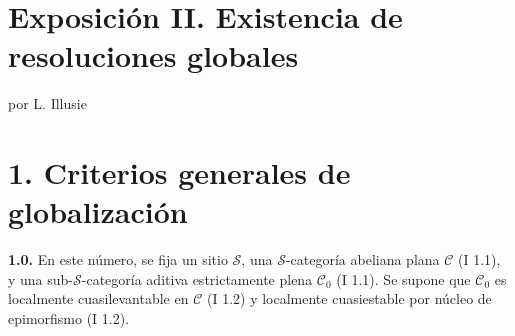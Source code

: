\providecommand{\sisi}[2]{#2}

\section*{Exposición II. Existencia de resoluciones globales}
\begin{center}
por L. Illusie
\end{center}

\section*{1. Criterios generales de globalización}

\textbf{1.0.} En este número, se fija un sitio $\sisi{S}{\mathcal S}$, una $\sisi{S}{\mathcal S}$-categoría abeliana plana \(\mathcal C\) (I 1.1), y una sub-$\sisi{S}{\mathcal S}$-categoría aditiva estrictamente plena \(\mathcal C_0\) (I 1.1). Se supone que \(\mathcal C_0\) es localmente cuasilevantable en \(\mathcal C\) (I 1.2) y localmente cuasiestable por núcleo de epimorfismo (I 1.2).

